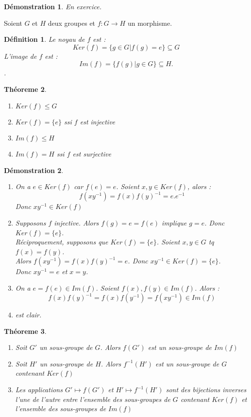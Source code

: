 \documentclass[a4paper, oneside]{report}
\theoremstyle{break}
\newtheorem{thm}{Théoreme}[section] %
\newtheorem{defi}[thm]{Définition}
\newtheorem*{demo}{Démonstration}
\begin{document}
\begin{demo}
	En exercice.
\end{demo}

Soient $G$ et $H$ deux groupes et $f:G\rightarrow H$ un morphisme.

\begin{defi}
	Le noyau de $f$ est :
	$$Ker(f)=\{g\in G | f(g) =e \} \subseteq G$$
	L'image de $f$ est :
	$$Im(f)=\{f(g)| g\in G\} \subseteq H.$$.
\end{defi}

\begin{thm}
	\begin{enumerate}
		\item $Ker(f)\leq G$
		\item $Ker(f)=\{e\}$ ssi $f$ est injective
		\item $Im(f)\leq H$
		\item $Im(f)=H$ ssi $f$ est surjective
	\end{enumerate}
\end{thm}

\begin{demo}
	\begin{enumerate}
		\item On a $e\in Ker(f)$ car $f(e)=e$. Soient $x,y\in Ker(f)$, alors :
		$$f(xy^{-1})=f(x)f(y)^{-1}=e.e^{-1}$$
		Donc $xy^{-1}\in Ker(f)$
		
		\item Supposons $f$ injective. Alors $f(g)=e=f(e)$ implique $g=e$. Donc $Ker(f)=\{e\}$.\\
		Réciproquement, supposons que $Ker(f)=\{e\}$. Soient $x,y\in G$ tq $f(x)=f(y)$.\\
		Alors $f(xy^{-1})=f(x)f(y)^{-1}=e$. Donc $xy^{-1}\in Ker(f)=\{ e \}$.\\
		Donc $xy^{-1}=e$ et $x=y$.
		
		\item On a $e=f(e)\in Im(f)$. Soient $f(x),f(y)\in Im(f)$. Alors :
		$$f(x)f(y)^{-1}=f(x)f(y^{-1})=f(xy^{-1})\in Im(f)$$
		
		\item est clair.
	\end{enumerate}	
\end{demo}

\begin{thm}
	\begin{enumerate}
		\item Soit $G'$ un sous-groupe de $G$. Alors $f(G')$ est un sous-groupe de $Im(f)$
		\item Soit $H'$ un sous-groupe de $H$. Alors $f^{-1}(H')$ est un sous-groupe de $G$ contenant $Ker(f)$
		\item Les applications $G'\mapsto f(G')$ et $H'\mapsto f^{-1}(H')$ sont des bijections inverses l'une de l'autre entre l'ensemble des sous-groupes de $G$ contenant $Ker(f)$ et l'ensemble des sous-groupes de $Im(f)$
	\end{enumerate}
\end{thm} 
\end{document}
